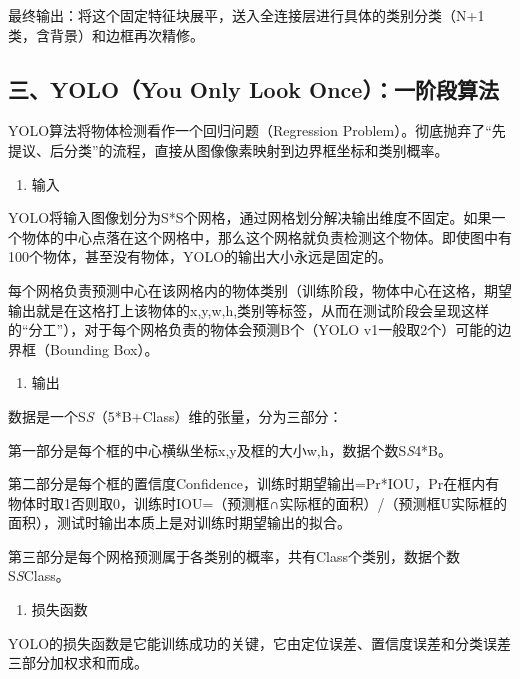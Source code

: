 最终输出：将这个固定特征块展平，送入全连接层进行具体的类别分类（N+1类，含背景）和边框再次精修。

\hypertarget{ux4e09yoloyou-only-look-onceux4e00ux9636ux6bb5ux7b97ux6cd5}{%
\subsection{三、YOLO（You Only Look Once）：一阶段算法}\label{ux4e09yoloyou-only-look-onceux4e00ux9636ux6bb5ux7b97ux6cd5}}

YOLO算法将物体检测看作一个回归问题（Regression Problem）。彻底抛弃了``先提议、后分类''的流程，直接从图像像素映射到边界框坐标和类别概率。

\begin{enumerate}
\def\labelenumi{\arabic{enumi}.}
\tightlist
\item
  输入
\end{enumerate}

YOLO将输入图像划分为S*S个网格，通过网格划分解决输出维度不固定。如果一个物体的中心点落在这个网格中，那么这个网格就负责检测这个物体。即使图中有100个物体，甚至没有物体，YOLO的输出大小永远是固定的。

每个网格负责预测中心在该网格内的物体类别（训练阶段，物体中心在这格，期望输出就是在这格打上该物体的x,y,w,h,类别等标签，从而在测试阶段会呈现这样的``分工''），对于每个网格负责的物体会预测B个（YOLO v1一般取2个）可能的边界框（Bounding Box）。

\begin{enumerate}
\def\labelenumi{\arabic{enumi}.}
\setcounter{enumi}{1}
\tightlist
\item
  输出
\end{enumerate}

数据是一个S\emph{S}（5*B+Class）维的张量，分为三部分：

第一部分是每个框的中心横纵坐标x,y及框的大小w,h，数据个数S\emph{S}4*B。

第二部分是每个框的置信度Confidence，训练时期望输出=Pr*IOU，Pr在框内有物体时取1否则取0，训练时IOU=（预测框∩实际框的面积）/（预测框U实际框的面积），测试时输出本质上是对训练时期望输出的拟合。

第三部分是每个网格预测属于各类别的概率，共有Class个类别，数据个数S\emph{S}Class。

\begin{enumerate}
\def\labelenumi{\arabic{enumi}.}
\setcounter{enumi}{2}
\tightlist
\item
  损失函数
\end{enumerate}

YOLO的损失函数是它能训练成功的关键，它由定位误差、置信度误差和分类误差三部分加权求和而成。


